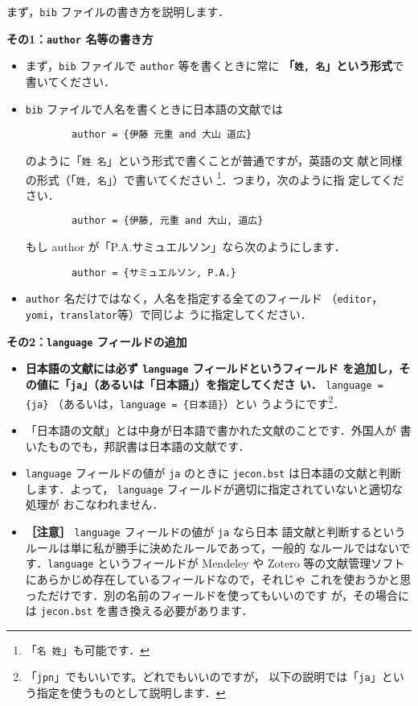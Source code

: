 \documentclass[article]{jlreq}
\begin{document}
まず，\texttt{bib} ファイルの書き方を説明します．
\vspace*{1em}

\textbf{その1：\texttt{author} 名等の書き方}
\begin{itemize}
 \item まず，\texttt{bib} ファイルで \texttt{author} 等を書くときに常に
       \textbf{「\texttt{姓,\ 名}」という形式}で書いてください．
 \item \texttt{bib} ファイルで人名を書くときに日本語の文献では
\begin{verbatim}
        author = {伊藤 元重 and 大山 道広}
\end{verbatim}
       のように「\verb|姓 名|」という形式で書くことが普通ですが，英語の文
       献と同様の形式（「\verb|姓, 名|」）で書いてください
       \footnote{「\texttt{名\ 姓}」も可能です．}．つまり，次のように指
       定してください．
\begin{verbatim}
        author = {伊藤, 元重 and 大山, 道広}
\end{verbatim}
       もし author が「P.A.サミュエルソン」なら次のようにします．
\begin{verbatim}
        author = {サミュエルソン, P.A.}
\end{verbatim}
 \item \texttt{author} 名だけではなく，人名を指定する全てのフィールド
       （\texttt{editor}，\texttt{yomi}，\texttt{translator}等）で同じよ
       うに指定してください．
\end{itemize}

\vspace*{1em}

\textbf{その2：\texttt{language} フィールドの追加}
\begin{itemize}
 \item \textbf{日本語の文献には必ず \texttt{language} フィールドというフィールド
       を追加し，その値に「\texttt{ja}」（あるいは「日本語」）を指定してくださ
       い．} \verb|language = {ja}| （あるいは，\verb|language = {日本語}|）とい
       うようにです\footnote{「\texttt{jpn}」でもいいです。どれでもいいのですが，
       以下の説明では「\texttt{ja}」という指定を使うものとして説明します．}．
 \item 「日本語の文献」とは中身が日本語で書かれた文献のことです．外国人が
       書いたものでも，邦訳書は日本語の文献です．
 \item \texttt{language} フィールドの値が \texttt{ja} のときに
       \texttt{jecon.bst} は日本語の文献と判断します．よって，
       \texttt{language} フィールドが適切に指定されていないと適切な処理が
       おこなわれません．
 \item \textbf{［注意］} \texttt{language} フィールドの値が \texttt{ja} なら日本
       語文献と判断するというルールは単に私が勝手に決めたルールであって，一般的
       なルールではないです．\texttt{language} というフィールドが Mendeley や
       Zotero 等の文献管理ソフトにあらかじめ存在しているフィールドなので，それじゃ
       これを使おうかと思っただけです．別の名前のフィールドを使ってもいいのです
       が，その場合には \texttt{jecon.bst} を書き換える必要があります．
\end{itemize}
\end{document}
